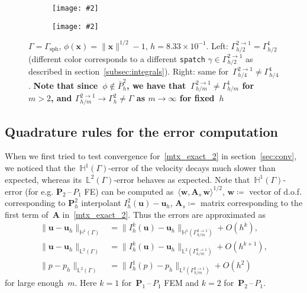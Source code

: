 \documentclass[12pt]{article}
\newcommand{\includegraphicsw}[2][1.]{\texttt{[image: \#2]}}
\newcommand{\vect}[1]{\boldsymbol{\mathbf{#1}}}
\newcommand{\sphere}{{\Gamma_{\text{sph}}}}
\newcommand{\LTwoSpace}[1][\Gamma]{{\mathbb L^2\left({#1}\right)}}
\newcommand{\HOneSpace}[1][\Gamma]{{\mathbb H^1\left({#1}\right)}}
\begin{document}
\begin{figure}[h!]
	\centering
	\begin{subfigure}{.5\linewidth}
		\centering
		\includegraphicsw[.6]{patches_2_inexact.png}
	\end{subfigure}%
	\begin{subfigure}{.5\linewidth}
		\centering
		\includegraphicsw[.6]{patches_4_inexact.png}
	\end{subfigure}%
	\par\bigskip
	\caption{$\Gamma = \sphere$, $\phi(\vect x) = \|\vect x\|^{1/2} - 1$, $h = 8.33\times10^{-1}$. Left: $\Gamma_{h/2}^{2 \rightarrow 1} = \Gamma_{h/2}^1$ (different color corresponds to a different \texttt{spatch} $\gamma \in \Gamma_{h/2}^{2 \rightarrow 1}$ as described in section~\ref{subsec:integrals}). Right: same for~$\Gamma_{h/4}^{2 \rightarrow 1} \ne \Gamma_{h/4}^1$. \textbf{Note that since~$\phi \not\in \bar{P}^2_h$, we have that~$\Gamma_{h/m}^{2 \rightarrow 1} \ne \Gamma_{h/m}^1$ for~$m > 2$, and $\Gamma_{h/m}^{2 \rightarrow 1} \rightarrow \Gamma_h^2 \ne \Gamma$ as $m \rightarrow \infty$ for fixed~$h$}}
	\label{fig:phi_inexact}		
\end{figure}
\clearpage

\subsection{Quadrature rules for the error computation}\label{subsec:err}

When we first tried to test convergence for~\eqref{mtx_exact_2} in section~\ref{sec:conv}, we noticed that the~$\HOneSpace$-error of the velocity decays much slower than expected, whereas its~$\LTwoSpace$-error behaves as expected. Note that~$\HOneSpace$-error (for e.g. $\vect P_2$\,--\,$P_1$ FE) can be computed as~$\langle \vect w, \vect A_s\,\vect w \rangle^{1/2}$, $\vect w \coloneqq$ vector of d.o.f. corresponding to $\vect P^2_h$ interpolant $I_h^2(\vect u) - \vect u_h$, $\vect A_s \coloneqq$ matrix corresponding to the first term of~$\vect A$ in~\eqref{mtx_exact_2}. Thus the errors are approximated as
\begin{align*}
	\| \vect u - \vect u_h \|_{\HOneSpace} &= \| I^k_h(\vect u) - \vect u_h \|_{\HOneSpace[\Gamma_{h/m}^{2 \to 1}]} + O(h^{k}), \\
	\| \vect u - \vect u_h \|_{\LTwoSpace} &= \| I^k_h(\vect u) - \vect u_h \|_{\LTwoSpace[\Gamma_{h/m}^{2 \to 1}]} + O(h^{k+1}), \\
	\| p - p_h \|_{\LTwoSpace} &= \| I^1_h(p) - p_h \|_{\LTwoSpace[\Gamma_{h/m}^{2 \to 1}]} + O(h^2)
\end{align*}
for large enough~$m$. Here $k = 1$ for~$\vect P_1$\,--\,$P_1$ FEM and $k = 2$ for~$\vect P_2$\,--\,$P_1$.
\end{document}
